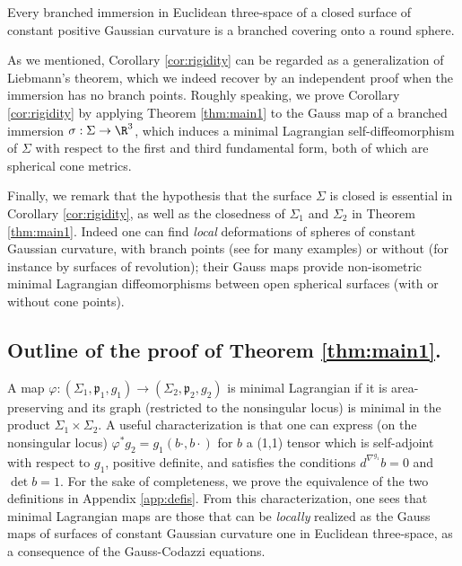 \begin{cor}\label{cor:rigidity}
Every branched immersion in Euclidean three-space of a closed surface of constant positive Gaussian curvature is a branched covering onto a round sphere.
\end{cor}

As we mentioned, Corollary \ref{cor:rigidity} can be regarded as a generalization of Liebmann's theorem, which we indeed recover by an independent proof when the immersion has no branch points. Roughly speaking, we prove Corollary \ref{cor:rigidity} by applying Theorem \ref{thm:main1} to the Gauss map of a branched immersion $\sigma:\Sigma\to\R^3$, which induces a minimal Lagrangian self-diffeomorphism of $\Sigma$ with respect to the first and third fundamental form, both of which are spherical cone metrics.

Finally, we remark that the hypothesis that the surface $\Sigma$ is closed is essential in Corollary \ref{cor:rigidity}, as well as the closedness of $\Sigma_1$ and $\Sigma_2$ in Theorem \ref{thm:main1}. Indeed one can find \emph{local} deformations of spheres of constant Gaussian curvature, with branch points (see \cite{zbMATH06599450} for many examples) or without (for instance by surfaces of revolution); their Gauss maps provide non-isometric minimal Lagrangian diffeomorphisms between open spherical surfaces (with or without cone points).

\subsection{Outline of the proof of Theorem \ref{thm:main1}.} \label{sec:outline}

A map $\varphi:(\Sigma_1,\mathfrak p_1,g_1)\to(\Sigma_2,\mathfrak p_2,g_2)$ is minimal Lagrangian if it is area-preserving and its graph (restricted to the nonsingular locus) is minimal in the product $\Sigma_1\times\Sigma_2$. A useful characterization is that one can express (on the nonsingular locus) $\varphi^*g_2=g_1(b\cdot,b\cdot)$ for $b$ a (1,1) tensor which is self-adjoint with respect to $g_1$, positive definite, and satisfies the conditions $d^{\nabla^{g_1}}\!b=0$ and $\det b=1$. For the sake of completeness, we prove the equivalence of the two definitions in Appendix \ref{app:defis}. From this characterization, one sees that minimal Lagrangian maps are those that can be \emph{locally} realized as the Gauss maps of surfaces of constant Gaussian curvature one in Euclidean three-space, as a consequence of the Gauss-Codazzi equations.

